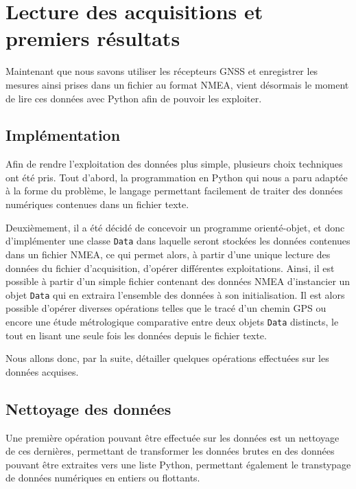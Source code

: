 \section{Lecture des acquisitions et premiers résultats}\label{sec:lecture-des-acquisitions-et-premiers-resultats}
   Maintenant que nous savons utiliser les récepteurs GNSS et enregistrer les mesures ainsi prises dans un fichier au format NMEA, vient désormais le moment de lire ces données avec Python afin de pouvoir les exploiter.

   \subsection{Implémentation}\label{subsec:implementation}
      Afin de rendre l'exploitation des données plus simple, plusieurs choix techniques ont été pris.
      Tout d'abord, la programmation en Python qui nous a paru adaptée à la forme du problème, le langage permettant facilement de traiter des données numériques contenues dans un fichier texte.

      Deuxièmement, il a été décidé de concevoir un programme orienté-objet, et donc d'implémenter une classe \texttt{Data} dans laquelle seront stockées les données contenues dans un fichier NMEA, ce qui permet alors, à partir d'une unique lecture des données du fichier d'acquisition, d'opérer différentes exploitations.
      Ainsi, il est possible à partir d'un simple fichier contenant des données NMEA d'instancier un objet \texttt{Data} qui en extraira l'ensemble des données à son initialisation.
      Il est alors possible d'opérer diverses opérations telles que le tracé d'un chemin GPS ou encore une étude métrologique comparative entre deux objets \texttt{Data} distincts, le tout en lisant une seule fois les données depuis le fichier texte.

      Nous allons donc, par la suite, détailler quelques opérations effectuées sur les données acquises.


   \subsection{Nettoyage des données}\label{subsec:nettoyage-des-donnees}
      Une première opération pouvant être effectuée sur les données est un \og nettoyage \fg{} de ces dernières, permettant de transformer les données brutes en des données pouvant être extraites vers une liste Python, permettant également le transtypage de données numériques en entiers ou flottants.


